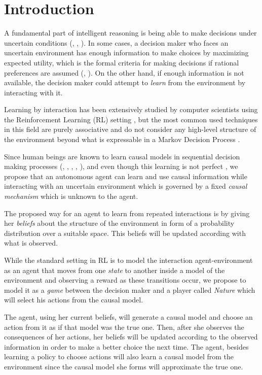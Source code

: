 \documentclass{article}
\begin{document}
\section{Introduction}
A fundamental part of intelligent reasoning is being able to make decisions under uncertain conditions (\cite{lake2017building}, \cite{danks2014unifying}, \cite{pearlwhy}). In some cases, a decision maker who faces an uncertain environment has enough information to make choices by maximizing expected utility, which is the formal criteria for making decisions if rational preferences are assumed (\cite{bernardo2000bayesian}, \cite{gilboa2009decision}). On the other hand, if enough information is not available, the decision maker could attempt to \textit{learn} from the environment by interacting with it.

Learning by interaction has been extensively studied by computer scientists using the Reinforcement Learning (RL) setting \cite{sutton1998reinforcement}, but the most common used techniques  in this field are purely associative and do not consider any high-level structure of the environment beyond what is expressable in a Markov Decision Process \cite{garnelo2016towards}.

Since human beings are known to learn causal models in sequential decision making processes (\cite{sloman2006causal}, \cite{nichols2007decision}, \cite{meder2010observing}, \cite{hagmayer2013repeated}, \cite{danks2014unifying}), and even though this learning is not perfect \cite{rottman2014reasoning}, we propose that an autonomous agent can learn and use causal information while interacting with an uncertain environment which is governed by a fixed \textit{causal mechanism} which is unknown to the agent.  

The proposed way for an agent to learn from repeated interactions is by giving her \textit{beliefs} about the structure of the environment in form of a probability distribution over a suitable space. This beliefs will be updated according with what is observed.

While the standard setting in RL is to model the interaction agent-environment as an agent that moves from one \textit{state} to another inside a model of the environment and observing a reward as these transitions occur, we propose to model it as a \textit{game} between the decision maker and a player called \textit{Nature} which will select his actions from the causal model.

The agent, using her current beliefs, will generate a causal model and choose an action from it as if that model was the true one. Then, after she observes the consequences of her actions, her beliefs will be updated according to the observed information in order to make a better choice the next time. The agent, besides learning a policy to choose actions will also learn a causal model from the environment since the causal model she forms will approximate the true one.
\end{document}

